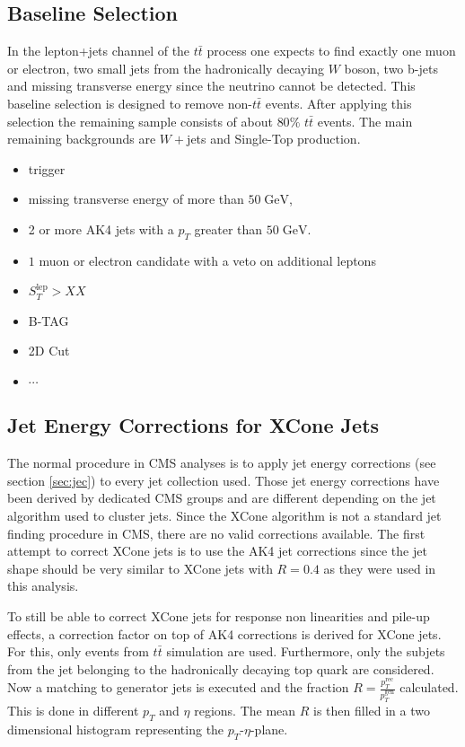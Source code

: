 \subsection{Baseline Selection}
\label{sec:PreSel}
	In the lepton+jets channel of the $t\bar{t}$ process one expects to find exactly one muon or electron, two small jets from the hadronically decaying $W$ boson, two b-jets and missing transverse energy since the neutrino cannot be detected. This baseline selection is designed to remove non-$t\bar{t}$ events. After applying this selection the remaining sample consists of about $80\%$ $t\bar{t}$ events. The main remaining backgrounds are $W+$jets and Single-Top production. 
	\begin{itemize}
	\item trigger
	\item missing transverse energy of more than $50\;\text{GeV}$,
	\item 2 or more AK4 jets with a $p_T$ greater than $50\;\text{GeV}$.
	\item $1$ muon or electron candidate with a veto on additional leptons
	\item $S_T^\text{lep} > XX$
	\item B-TAG
	\item 2D Cut
	\item $\cdots$	
	\end{itemize}
	
\subsection{Jet Energy Corrections for XCone Jets} 
	The normal procedure in CMS analyses is to apply jet energy corrections (see section \ref{sec:jec}) to every jet collection used. Those jet energy corrections have been derived by dedicated CMS groups and are different depending on the jet algorithm used to cluster jets. Since the XCone algorithm is not a standard jet finding procedure in CMS, there are no valid corrections available. The first attempt to correct XCone jets is to use the AK4 jet corrections since the jet shape should be very similar to XCone jets with $R=0.4$ as they were used in this analysis.
	
	To still be able to correct XCone jets for response non linearities and pile-up effects, a correction factor on top of AK4 corrections is derived for XCone jets. For this, only events from $t\bar{t}$ simulation are used. Furthermore, only the subjets from the jet belonging to the hadronically decaying top quark are considered. Now a matching to generator jets is executed and the fraction $R=\frac{p_T^{\text{rec}}}{p_T^{\text{gen}}}$ calculated. This is done in different $p_T$ and $\eta$ regions. The mean $R$ is then filled in a two dimensional histogram representing the $p_T$-$\eta$-plane.
	
